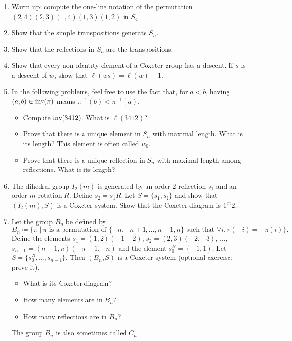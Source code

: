 \documentclass{article}
\numberwithin{equation}{section}
\theoremstyle{remark}
\theoremstyle{definition}
\begin{document}
	\begin{enumerate}
		\item Warm up: compute the one-line notation of the permutation $(2,4)(2,3)(1,4)(1,3)(1,2)$ in $S_4$.
		
		\item Show that the simple transpositions generate $S_n$.
		
		\item Show that the reflections in $S_n$ are the transpositions.
		
		
		\item Show that every non-identity element of a Coxeter group has a descent. If $s$ is a descent of $w$, show that $\ell(ws)= \ell(w)-1$.
		
		\item In the following problems, feel free to use the fact that, for $a<b$, having $(a,b)\in \operatorname{inv}(\pi)$ means $\pi^{-1}(b)<\pi^{-1}(a)$. 
		\begin{itemize}
			\item[(a)] Compute $\operatorname{inv}(3412)$. What is $\ell(3412)$? 
			\item[(b)] Prove that there is a unique element in $S_n$ with maximal length. What is its length? This element is often called $w_0$. 
			\item[(c)] Prove that there is a unique reflection in $S_n$ with maximal length among reflections. What is its length?
		\end{itemize}
		
		
		\item The dihedral group $I_2(m)$ is generated by an order-$2$ reflection $s_1$ and an order-$m$ rotation $R$. Define $s_2 = s_1R$. Let $S=\{s_1,s_2\}$ and show that $(I_2(m),S)$ is a Coxeter system. Show that the Coxeter diagram is $1\overset{m}{-}2$.
		
		\item Let the group $B_n$ be defined by 
		\[ B_n \coloneqq \{\pi\mid \pi\text{ is a permutation of } \{-n,-n+1,\ldots, n-1, n\}\text{ such that $\forall i,\pi(-i)=-\pi(i)$}   \}. \]
		Define the elements $s_1 =(1,2)(-1,-2)$, $s_2=(2,3)(-2,-3)$, $\ldots,$ $s_{n-1}=(n-1,n)(-n+1,-n)$ and the element $s_0^B=(-1,1)$. Let $S = \{s_0^B,\ldots, s_{n-1}\}$. Then $(B_n,S)$ is a Coxeter system (optional exercise: prove it). 
		\begin{itemize}
		\item What is its Coxeter diagram? 
		\item How many elements are in $B_n$?
		\item How many reflections are in $B_n$?
		\end{itemize} 
		The group $B_n$ is also sometimes called $C_n$.
		

\end{enumerate}
\end{document}
